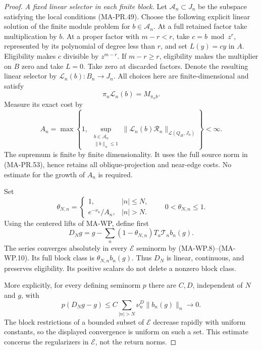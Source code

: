 \begin{proof}
\emph{A fixed linear selector in each finite block.}
Let \(\mathcal A_n\subset J_n\) be the subspace satisfying
the local conditions (MA-PR.49).
Choose the following explicit linear solution of the
finite module problem for \(b\in\mathcal A_n\).
At a full retained factor take multiplication by \(b\).
At a proper factor with \(m-r<r\), take
\(c=b\bmod z^r\), represented by its polynomial of
degree less than \(r\), and set \(L(y)=cy\) in \(A\).
Eligibility makes \(c\) divisible by \(z^{m-r}\).
If \(m-r\ge r\), eligibility makes the multiplier
on \(B\) zero and take \(L=0\).
Take zero at discarded factors.
Denote the resulting linear selector by
\(\mathcal L_n(b):B_n\to J_n\).
All choices here are finite-dimensional and satisfy
\[
       \pi_n\mathcal L_n(b)=M_{\pi_nb}.
 \tag{MA-PR.63}
\]
Measure its exact cost by
\[
 A_n=\max\left\{1,\
   \sup_{\substack{b\in\mathcal A_n\\\|b\|_n\le1}}
       \|\mathcal L_n(b)\mathscr R_n\|_{\mathcal L(Q_H,J_n)}
                                    \right\}<\infty .
 \tag{MA-PR.64}
\]
The supremum is finite by finite dimensionality.
It uses the full source norm in (MA-PR.53), hence
retains all oblique-projection and near-edge costs.
No estimate for the growth of \(A_n\) is required.

Set
\[
 \theta_{N,n}=
 \begin{cases}
 1,& |n|\le N,\\
 e^{-\nu_n}/A_n,& |n|>N .
 \end{cases}
 \qquad 0<\theta_{N,n}\le1 .
 \tag{MA-PR.65}
\]
Using the centered lifts of MA-WP, define first
\[
 D_Ng=g-\sum_n(1-\theta_{N,n})
                         T_a\mathcal T_n b_n(g).
 \tag{MA-PR.66}
\]
The series converges absolutely in every
\(\mathcal E\) seminorm by (MA-WP.8)--(MA-WP.10).
Its full block class is
\(\theta_{N,n}b_n(g)\).
Thus \(D_N\) is linear, continuous, and preserves
eligibility.  Its positive scalars do not delete a
nonzero block class.

More explicitly, for every defining seminorm \(p\)
there are \(C,D\), independent of \(N\) and \(g\), with
\[
 p(D_Ng-g)
       \le C\sum_{|n|>N}\nu_n^D\|b_n(g)\|_n
                              \longrightarrow0 .
 \tag{MA-PR.67}
\]
The block restrictions of a bounded subset of
\(\mathcal E\) decrease rapidly with uniform constants,
so the displayed convergence is uniform on such a set.
This estimate concerns the regularizers in
\(\mathcal E\), not the return norms.


\end{proof}
